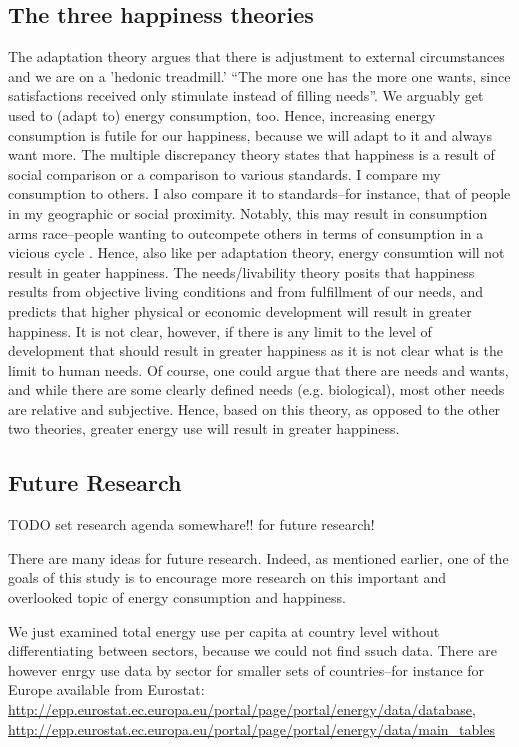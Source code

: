 \documentclass[10pt, letterpaper]{article}
\begin{document}
\begin{spacing}{1.4}
\subsection{The three happiness theories}
The adaptation theory \cite{brickman78cj} argues that there is
adjustment to external circumstances and we are on a 'hedonic
treadmill.' ``The more one has the more one wants, since satisfactions
received only stimulate instead of filling needs''\cite{durkheim50}. 
We arguably get used to (adapt to) energy consumption, too. Hence, increasing
energy consumption is futile for our happiness, because we will adapt to it and
always want more.
%
The  multiple discrepancy theory  \cite{michalos85} states that
happiness is a result of social comparison or a comparison to various
standards.  I compare my consumption to others. I also compare
it to standards--for instance, that of people in my geographic or social
proximity. Notably, this may result in consumption arms race--people wanting to
outcompete others in terms of consumption in a vicious
cycle \cite{frank12}. Hence, also like  per adaptation theory, energy consumtion
will not result in geater happiness.  
%
  The needs/livability theory \cite{veenhoven95, veenhoven14b} posits that
  happiness results from objective living conditions and from
  fulfillment of our needs, and predicts that higher physical or economic
  development will result in greater happiness. It is not clear, however, if
  there is any limit to the level of development that should result in greater
  happiness as it is not clear what is the limit to human needs. Of course, one
  could argue that there are needs and wants, and while there are some clearly
  defined needs (e.g. biological), most other needs are relative and
  subjective. Hence, based on this theory, as opposed to the other two theories,
  greater energy use will result in greater happiness.
  
\subsection{Future Research}

TODO set research agenda somewhare!! for future research!

There are many ideas for future research. Indeed, as mentioned earlier, one of
the goals of this study is to encourage more research on this important and
overlooked topic of energy consumption and happiness.

We just examined total energy use per capita at country level without
differentiating between sectors, because we could not find ssuch data. There are
however enrgy use data by sector for smaller sets of countries--for instance for
Europe available from Eurostat: 
\url{http://epp.eurostat.ec.europa.eu/portal/page/portal/energy/data/database}, \url{http://epp.eurostat.ec.europa.eu/portal/page/portal/energy/data/main_tables} 


\end{spacing}
\end{document}
